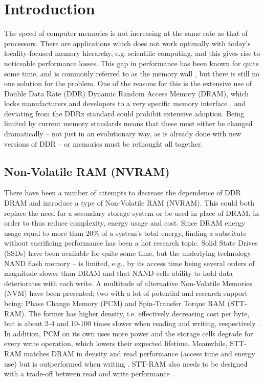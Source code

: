 \chapter{Introduction} \label{intro}
The speed of computer memories is not increasing at the same rate as that of processors. There are applications which does not work optimally with today's locality-focused memory hierarchy, e.g. scientific computing, and this gives rise to noticeable performance losses. This gap in performance has been known for quite some time, and is commonly referred to as the memory wall \cite{wulf1995hitting}, but there is still no one solution for the problem. One of the reasons for this is the extensive use of Double Data Rate (DDR) Dynamic Random Access Memory (DRAM), which locks manufacturers and developers to a very specific memory interface \cite{standard2008double}, and deviating from the DDRx standard could prohibit extensive adoption. Being limited by current memory standards means that these must either be changed dramatically -- not just in an evolutionary way, as is already done with new versions of DDR -- or memories must be rethought all together. 

\section{Non-Volatile RAM (NVRAM)}
There have been a number of attempts to decrease the dependence of DDR DRAM and introduce a type of Non-Volatile RAM (NVRAM). This could both replace the need for a secondary storage system or be used in place of DRAM, in order to thus reduce complexity, energy usage and cost. Since DRAM energy usage equal to more than 20\% of a system's total energy, finding a substitute without sacrificing performance has been a hot research topic\cite{4658649}. Solid State Drives (SSDs) have been available for quite some time, but the underlying technology -- NAND flash memory -- is limited, e.g., by its access time being several orders of magnitude slower than DRAM and that NAND cells ability to hold data deteriorates with each write. A multitude of alternative Non-Volatile Memories (NVM) have been presented; two with a lot of potential and research support being: Phase Change Memory (PCM) and Spin-Transfer Torque RAM (STT-RAM). The former has higher density, i.e. effectively decreasing cost per byte, but is about 2-4 and 10-100 times slower when reading and writing, respectively \cite{Qureshi:2009:SHP:1555754.1555760}\cite{5388621}. In addition, PCM on its own uses more power and the storage cells degrade for every write operation, which lowers their expected lifetime.  Meanwhile, STT-RAM matches DRAM in density and read performance (access time and energy use) but is outperformed when writing \cite{6557176}\cite{6027811}. STT-RAM also needs to be designed with a trade-off between read and write performance \cite{Wang_2013}\cite{Khvalkovskiy_2013}.
\bigskip


